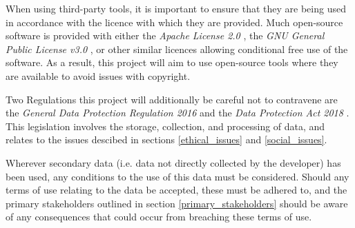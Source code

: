 %
%
%

When using third-party tools, it is important to ensure that they are being used in accordance with the licence with which they are provided.
Much open-source software is provided with either the \textit{Apache License 2.0} \cite{apache_2_0}, the \textit{GNU General Public License v3.0} \cite{gnu_gpl_3}, or other similar licences allowing conditional free use of the software.
As a result, this project will aim to use open-source tools where they are available to avoid issues with copyright.

Two Regulations this project will additionally be careful not to contravene are the \textit{General Data Protection Regulation 2016} \cite{eu_2016_679} and the \textit{Data Protection Act 2018} \cite{uk_dpa_2018}. This legislation involves the storage, collection, and processing of data, and relates to the issues descibed in sections \ref{ethical_issues} and \ref{social_issues}.

Wherever secondary data (i.e. data not directly collected by the developer) has been used, any conditions to the use of this data must be considered. Should any terms of use relating to the data be accepted, these must be adhered to, and the primary stakeholders outlined in section \ref{primary_stakeholders} should be aware of any consequences that could occur from breaching these terms of use.
